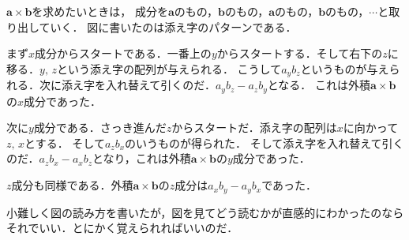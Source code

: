 $\bm{a} \times \bm{b}$を求めたいときは，
成分を$\bm{a}$のもの，$\bm{b}$のもの，$\bm{a}$のもの，$\bm{b}$のもの，$\cdots$と取り出していく．
図に書いたのは添え字のパターンである．

まず$x$成分からスタートである．一番上の$y$からスタートする．そして右下の$z$に移る．$y, \, z$という添え字の配列が与えられる．
こうして$a_y b_z$というものが与えられる．次に添え字を入れ替えて引くのだ．$a_y b_z - a_z b_y$となる．
これは外積$\bm{a} \times \bm{b}$の$x$成分であった．

次に$y$成分である．さっき進んだ$z$からスタートだ．添え字の配列は$x$に向かって$z, \, x$とする．
そして$a_z b_x$のいうものが得られた．
そして添え字を入れ替えて引くのだ．$a_z b_x - a_x b_z$となり，これは外積$\bm{a} \times \bm{b}$の$y$成分であった．

$z$成分も同様である．外積$\bm{a} \times \bm{b}$の$z$成分は$a_x b_y - a_y b_x$であった．

小難しく図の読み方を書いたが，図を見てどう読むかが直感的にわかったのならそれでいい．とにかく覚えられればいいのだ．

